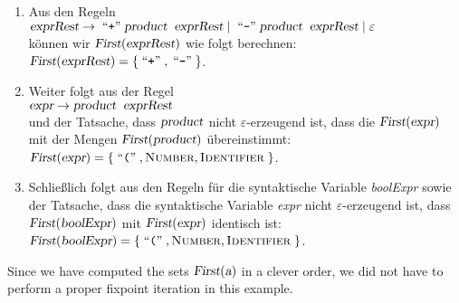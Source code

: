 \begin{enumerate}
\item Aus den Regeln
      \\[0.2cm]
      \hspace*{1.3cm}
      $\textsl{exprRest} \rightarrow \;\mbox{``\texttt{+}''}\; \textsl{product}\;\;\textsl{exprRest} 
                         \mid        \;\mbox{``\texttt{-}''}\; \textsl{product}\;\;\textsl{exprRest} 
                         \mid        \varepsilon$
      \\[0.2cm]
      können wir $\textsl{First}(\textsl{exprRest})$ wie folgt berechnen:
      \\[0.2cm]
      \hspace*{1.3cm}
      $\textsl{First}(\textsl{exprRest}) = \{ \;\mbox{``\texttt{+}''}\;, \;\mbox{``\texttt{-}''}\; \}$.
\item Weiter folgt aus der Regel
      \\[0.2cm]
      \hspace*{1.3cm}
      $\textsl{expr} \rightarrow \textsl{product}\;\;\textsl{exprRest}$
      \\[0.2cm]
      und der Tatsache, dass $\textsl{product}$ nicht $\varepsilon$-erzeugend ist,
      dass die  $\textsl{First}(\textsl{expr})$ mit der Mengen
      $\textsl{First}(\textsl{product})$ übereinstimmt:
      \\[0.2cm]
      \hspace*{1.3cm}
      $\textsl{First}(\textsl{expr}) = \{ \;\mbox{``\texttt{(}''}\;, \textsc{Number}, \textsc{Identifier}\; \}$.
\item Schließlich folgt aus den Regeln für die syntaktische Variable \textsl{boolExpr}
      sowie der Tatsache, dass die syntaktische Variable \textsl{expr} nicht $\varepsilon$-erzeugend ist,
      dass $\textsl{First}(\textsl{boolExpr})$ mit $\textsl{First}(\textsl{expr})$ identisch ist:
      \\[0.2cm]
      \hspace*{1.3cm}
      $\textsl{First}(\textsl{boolExpr}) = \{ \;\mbox{``\texttt{(}''}\;, \textsc{Number}, \textsc{Identifier}\; \}$.
\end{enumerate}
Since we have computed the sets $\textsl{First}(\textsl{a})$ in a clever order, we did not have to perform a
proper fixpoint iteration in this example.
\eox


